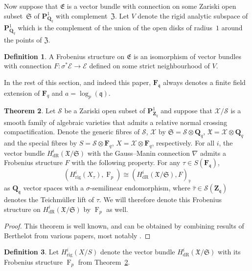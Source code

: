 \documentclass[a4paper,11pt]{article}
\numberwithin{equation}{section}
\newcommand{\ZZ}{\mathbf{Z}} %
\newcommand{\QQ}{\mathbf{Q}} %
\newcommand{\FF}{\mathbf{F}} %
\DeclareMathOperator{\Frob}{F}           %
\providecommand{\HdR}{H_{\text{dR}}}    %
\providecommand{\Hrig}{H_{\text{rig}}}  %
\theoremstyle{definition}
\newtheorem{thm}{Theorem}[section]
\newtheorem{defn}[thm]{Definition}
\begin{document}
Now suppose that $\mathfrak{E}$ is a vector bundle with connection on 
some Zariski open subset~$\mathfrak{S}$ of $\mathbf{P}^1_{\QQ_q}$ with 
complement~$\mathfrak{Z}$. Let $V$ denote the rigid analytic subspace 
of $\mathbf{P}^1_{\QQ_q}$ which is the complement of the union of the 
open disks of radius~$1$ around the points of $\mathfrak{Z}$.

\begin{defn}
A Frobenius structure on $\mathfrak{E}$ is an isomorphism of vector bundles 
with connection $F \colon \sigma^* \mathcal{E} \rightarrow \mathcal{E}$ 
defined on some strict neighbourhood of $V$. 
\end{defn}

In the rest of this section, and indeed this paper, $\FF_{\mathfrak{q}}$ always
denotes a finite field extension of $\FF_q$ and $a=\log_p(\mathfrak{q})$.

\begin{thm} \label{thm:frobstruc}
Let $\mathcal{S}$ be a Zariski open subset of $\mathbf{P}^1_{\ZZ_q}$ and 
suppose that $\mathcal{X}/\mathcal{S}$ is a smooth family of algebraic 
varieties that admits a relative normal crossing compactification. Denote 
the generic fibres of $\mathcal{S}$, $\mathcal{X}$ by 
$\mathfrak{S}=\mathcal{S} \otimes \QQ_q$, $\mathfrak{X}=\mathcal{X} \otimes \QQ_q$ 
and the special fibres by $S=\mathcal{S} \otimes \FF_q$, 
$X=\mathcal{X} \otimes \FF_q$, respectively. For all $i$, the vector bundle 
$\HdR^i(\mathfrak{X}/\mathfrak{S})$ with the Gauss--Manin connection $\nabla$ 
admits a Frobenius structure $F$ with the following property. 
For any $\tau \in S(\FF_{\mathfrak{q}})$,
\[
(\Hrig^i(X_{\tau}),\Frob_p) \cong (\HdR^i(\mathfrak{X}/\mathfrak{S}),F)_{\hat{\tau}}
\] 
as $\QQ_{\mathfrak{q}}$ vector spaces with a $\sigma$-semilinear 
endomorphism, where $\hat{\tau} \in \mathcal{S}(\ZZ_{\mathfrak{q}})$ denotes 
the Teichm\"uller lift of $\tau$. We will therefore denote this Frobenius 
structure on $\HdR^i(\mathfrak{X}/\mathfrak{S})$ by $\Frob_p$ as well.
\end{thm}

\begin{proof}
This theorem is well known, and can be obtained by combining results of 
Berthelot from various papers, most notably \citep{Berthelot1986}.   
\end{proof}

\begin{defn}
Let $\Hrig^i(X/S)$ denote the vector bundle $\HdR^i(\mathfrak{X}/\mathfrak{S})$ 
with its Frobenius structure $\Frob_p$ from Theorem~\ref{thm:frobstruc}.
\end{defn}
\end{document}
